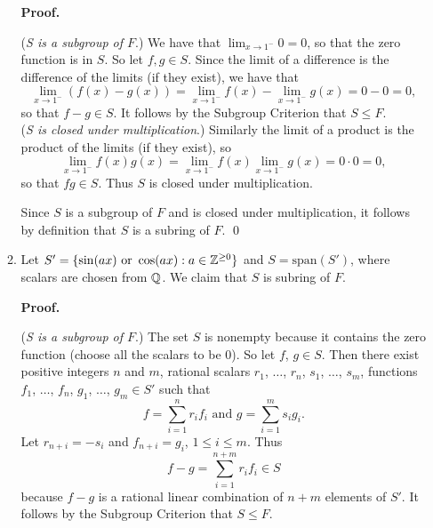 \begin{enumerate}
\begin{enumerate}
               \textbf{Proof.}

               (\textit{S is a subgroup of $F$}.) We have that
               $\lim_{x\rightarrow1^-}0 = 0$, so that the zero function is in
               $S$. So let $f, g \in S$. Since the limit of a difference is the
               difference of the limits (if they exist), we have that
               $$\lim_{x\rightarrow1^-}(f(x) - g(x)) =
                 \lim_{x\rightarrow1^-}f(x) - \lim_{x\rightarrow1^-}g(x) =
                  0 - 0 = 0,$$
               so that $f - g \in S$. It follows by the Subgroup Criterion that 
               $S \le F$. \\

               (\textit{S is closed under multiplication}.) Similarly the limit 
               of a product is the product of the limits (if they exist), so
               $$\lim_{x\rightarrow1^-}f(x)g(x) =
                 \lim_{x\rightarrow1^-}f(x)\lim_{x\rightarrow1^-}g(x) =
                  0 \cdot 0 = 0,$$
               so that $fg \in S$. Thus $S$ is closed under multiplication.
            
               Since $S$ is a subgroup of $F$ and is closed under
               multiplication, it follows by definition that $S$ is a subring of 
               $F$. \qed
         \item Let $S' = \{\sin (ax) \text{ or } \cos (ax) : a \in \mathbb{Z}^{\ge 0}\}$ 
               and $S = \text{span}(S')$, where scalars are chosen from $\mathbb{Q}$. We 
               claim that $S$ is subring of $F$.

               \textbf{Proof.} 

               (\textit{S is a subgroup of $F$}.) The set $S$ is nonempty 
               because it contains the zero function (choose all the scalars to 
               be 0). So let $f$, $g \in S$. Then there exist positive integers 
               $n$ and $m$, rational scalars $r_1$, $\ldots$, $r_n$, $s_1$,
               $\ldots$, $s_m$, functions $f_1$, $\ldots$, $f_n$, $g_1$,
               $\ldots$, $g_m \in S'$ such that
               $$f = \sum_{i=1}^n r_if_i \text{ and }g = \sum_{i=1}^m s_ig_i.$$
               Let $r_{n+i} = -s_i$ and $f_{n+i} = g_i$, $1 \le i \le m$. Thus
               $$f - g = \sum_{i=1}^{n+m} r_if_i \in S$$
               because $f - g$ is a rational linear combination of $n + m$
               elements of $S'$. It follows by the Subgroup Criterion that
               $S \le F$. \\


\end{enumerate}
\end{enumerate}
